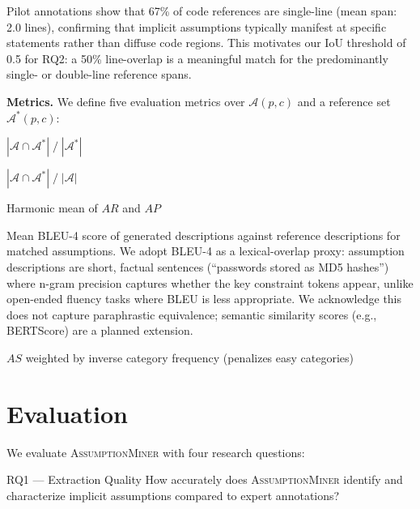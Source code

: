 \documentclass[sigconf,review,anonymous]{acmart}
\newcommand{\sysname}{\textsc{AssumptionMiner}\xspace}
\newcommand{\AR}{$\mathit{AR}$\xspace}
\newcommand{\AP}{$\mathit{AP}$\xspace}
\newcommand{\AFone}{$\mathit{AF_1}$\xspace}
\newcommand{\AS}{$\mathit{AS}$\xspace}
\newcommand{\CAS}{$\mathit{CAS}$\xspace}
\begin{document}
Pilot annotations show that 67\% of code references are single-line (mean span: 2.0 lines),
confirming that implicit assumptions typically manifest at specific statements rather than
diffuse code regions.  This motivates our IoU threshold of 0.5 for RQ2: a 50\% line-overlap
is a meaningful match for the predominantly single- or double-line reference spans.

\textbf{Metrics.}
We define five evaluation metrics over $\mathcal{A}(p,c)$ and a reference set
$\mathcal{A}^*(p,c)$:

\begin{description}[noitemsep, leftmargin=1em]
  \item[\AR (Assumption Recall):] $|\mathcal{A} \cap \mathcal{A}^*| \;/\; |\mathcal{A}^*|$
  \item[\AP (Assumption Precision):] $|\mathcal{A} \cap \mathcal{A}^*| \;/\; |\mathcal{A}|$
  \item[\AFone (Assumption $F_1$):] Harmonic mean of \AR and \AP
  \item[\AS (Assumption Specificity):] Mean BLEU-4 score of generated descriptions
       against reference descriptions for matched assumptions.
       We adopt BLEU-4 as a lexical-overlap proxy: assumption descriptions are
       short, factual sentences (``passwords stored as MD5 hashes'') where
       n-gram precision captures whether the key constraint tokens appear, unlike
       open-ended fluency tasks where BLEU is less appropriate.
       We acknowledge this does not capture paraphrastic equivalence; semantic
       similarity scores (e.g., BERTScore) are a planned extension.
  \item[\CAS (Category-Adjusted Specificity):] \AS weighted by inverse category
       frequency (penalizes easy categories)
\end{description}

\section{Evaluation}
\label{sec:evaluation}

We evaluate \sysname with four research questions:

\begin{rqbox}{RQ1 — Extraction Quality}
How accurately does \sysname identify and characterize implicit assumptions
compared to expert annotations?
\end{rqbox}
\end{document}
